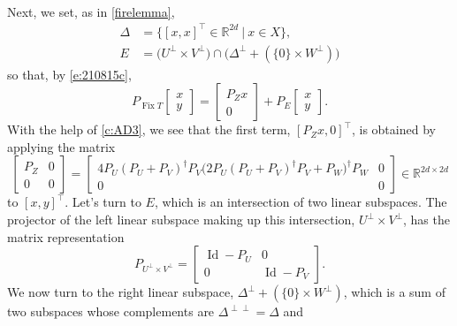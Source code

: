 \documentclass[11pt]{article}
\newcommand{\menge}[2]{\big\{{#1}~\big |~{#2}\big\}}
\newcommand{\RR}{\ensuremath{\mathbb R}}
\newcommand{\Fix}{\ensuremath{\operatorname{Fix}}}
\newcommand{\Id}{\ensuremath{\operatorname{Id}}}
\theoremstyle{definition}
\providecommand{\RR}{\mathbb{R}}
\providecommand{\Id}{\operatorname{{ Id}}}
\providecommand{\Id}{\operatorname{Id}}
\providecommand{\RR}{\mathbb{R}}
\begin{document}
{\begin{subequations}
\begin{align}
\end{align}
\end{subequations}
Next, we set, as in \cref{firelemma},
\begin{subequations}
\begin{align}
\Delta &= \menge{[x,x]^\intercal\in \RR^{2d}}{x\in X},\\
E&=\big(U^\perp\times V^\perp) \cap \big(\Delta^\perp+(\{0\}\times W^\perp) \big)\label{e:RyuE}
\end{align}
\end{subequations}
so that, by \cref{e:210815c},
\begin{equation}
\label{e:RyuE4}
P_{\Fix T}\begin{bmatrix}x\\y\end{bmatrix} = 
\begin{bmatrix}P_{Z}x\\0\end{bmatrix}+ P_E\begin{bmatrix}x\\y\end{bmatrix}.
\end{equation}
With the help of \cref{c:AD3}, we see that the first term, $[P_{Z}x,0]^\intercal$, 
is obtained by applying the matrix 
\begin{equation}
\label{e:RyuE1}
\begin{bmatrix}
P_Z & 0 \\
0 & 0 
\end{bmatrix}
= 
\begin{bmatrix}
4P_U(P_U+P_V)^\dagger P_V\big(2P_U(P_U+P_V)^\dagger P_V+P_W\big)^\dagger P_W & 0 \\
0 & 0
\end{bmatrix}
\in\RR^{2d\times 2d}
\end{equation}
to $[x,y]^\intercal$. 
Let's turn to $E$, which is an intersection of two linear subspaces.
The projector of the left linear subspace making up this intersection, $U^\perp\times V^\perp$, 
has the matrix representation
\begin{equation}
\label{e:RyuE3}
P_{U^\perp \times V^\perp} = 
\begin{bmatrix}
\Id-P_U & 0 \\
0 & \Id-P_V
\end{bmatrix}. 
\end{equation}
We now turn to the right linear subspace, 
$\Delta^\perp+(\{0\}\times W^\perp)$, which is a sum
of two subspaces whose complements are
$\Delta^{\perp\perp}=\Delta$ and
}
\end{document}
